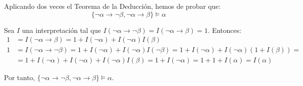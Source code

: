 \begin{ejercicio}
\begin{enumerate}
        Aplicando dos veces el Teorema de la Deducción, hemos de probar que:
        \begin{equation*}
            \{\neg\alpha\rightarrow\neg\beta,\neg\alpha\rightarrow\beta\} \models \alpha
        \end{equation*}

        Sea $I$ una interpretación tal que $I(\neg\alpha\rightarrow\neg\beta) = I(\neg\alpha\rightarrow\beta) = 1$. Entonces:
        \begin{align*}
            1&=I(\neg\alpha\rightarrow\beta) = 1+I(\neg\alpha)+I(\neg\alpha)I(\beta)\\
            1&=I(\neg\alpha\rightarrow\neg\beta) = 1+I(\neg\alpha)+I(\neg\alpha)I(\neg\beta) = 1+I(\neg\alpha)+I(\neg\alpha)\left(1+I(\beta)\right)
            =\\&= 1+I(\neg\alpha)+I(\neg\alpha)+I(\neg\alpha)I(\beta)=1+I(\neg\alpha)=1+1+I(\alpha)=I(\alpha)
        \end{align*}

        Por tanto, $\{\neg\alpha\rightarrow\neg\beta,\neg\alpha\rightarrow\beta\} \models \alpha$.
    \end{enumerate}
\end{ejercicio}

\begin{comment}
\setcounter{ejercicio}{5}
\begin{ejercicio}[Regla de ``reductio ad absurdum'' minimal o intuicionista]\label{ej:1.6}
    Si $\Gamma \cup \{\alpha\} \vdash \beta$ y $\Gamma \cup \{\alpha\} \vdash \neg\beta$, entonces $\Gamma \vdash \neg\alpha$.
\end{ejercicio}
\end{comment}

\begin{comment}
\setcounter{ejercicio}{6}
\begin{ejercicio}[Leyes de Duns Scoto]\label{ej:1.7}
    \begin{enumerate}
        \item $\vdash \neg\alpha \rightarrow (\alpha \rightarrow \beta)$.
        \item $\vdash \alpha \rightarrow (\neg\alpha \rightarrow \beta)$.
    \end{enumerate}
\end{ejercicio}
\end{comment}

\begin{comment}
\setcounter{ejercicio}{7}
\begin{ejercicio}[Principio de inconsistencia]\label{ej:1.8}
    Si $\Gamma \vdash \alpha$ y $\Gamma \vdash \neg\alpha$, entonces $\Gamma \vdash \beta$.
\end{ejercicio}
\end{comment}

